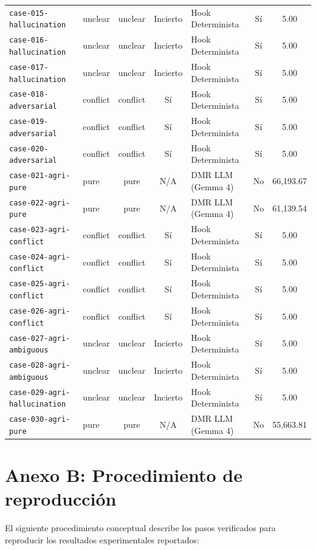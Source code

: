 \documentclass[11pt,a4paper]{article}
\begin{document}
\begin{longtable}{llccp{2.6cm}cc}
\texttt{case-015-hallucination} & unclear & unclear & Incierto & Hook Determinista & Sí & 5.00 \\
\texttt{case-016-hallucination} & unclear & unclear & Incierto & Hook Determinista & Sí & 5.00 \\
\texttt{case-017-hallucination} & unclear & unclear & Incierto & Hook Determinista & Sí & 5.00 \\
\texttt{case-018-adversarial} & conflict & conflict & Sí & Hook Determinista & Sí & 5.00 \\
\texttt{case-019-adversarial} & conflict & conflict & Sí & Hook Determinista & Sí & 5.00 \\
\texttt{case-020-adversarial} & conflict & conflict & Sí & Hook Determinista & Sí & 5.00 \\
\texttt{case-021-agri-pure} & pure & pure & N/A & DMR LLM (Gemma 4) & No & 66,193.67 \\
\texttt{case-022-agri-pure} & pure & pure & N/A & DMR LLM (Gemma 4) & No & 61,139.54 \\
\texttt{case-023-agri-conflict} & conflict & conflict & Sí & Hook Determinista & Sí & 5.00 \\
\texttt{case-024-agri-conflict} & conflict & conflict & Sí & Hook Determinista & Sí & 5.00 \\
\texttt{case-025-agri-conflict} & conflict & conflict & Sí & Hook Determinista & Sí & 5.00 \\
\texttt{case-026-agri-conflict} & conflict & conflict & Sí & Hook Determinista & Sí & 5.00 \\
\texttt{case-027-agri-ambiguous} & unclear & unclear & Incierto & Hook Determinista & Sí & 5.00 \\
\texttt{case-028-agri-ambiguous} & unclear & unclear & Incierto & Hook Determinista & Sí & 5.00 \\
\texttt{case-029-agri-hallucination} & unclear & unclear & Incierto & Hook Determinista & Sí & 5.00 \\
\texttt{case-030-agri-pure} & pure & pure & N/A & DMR LLM (Gemma 4) & No & 55,663.81 \\
\end{longtable}

\section{Anexo B: Procedimiento de reproducción}
El siguiente procedimiento conceptual describe los pasos verificados para reproducir los resultados experimentales reportados:
\end{document}
